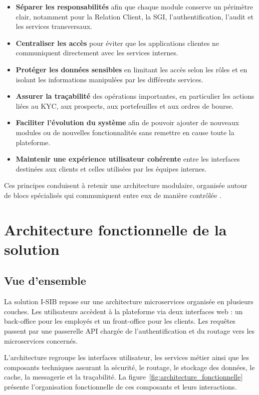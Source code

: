 \documentclass[a4paper,12pt]{report}
\begin{document}
\begin{itemize}
    \item \textbf{Séparer les responsabilités} afin que chaque module conserve un périmètre
          clair, notamment pour la Relation Client, la SGI, l'authentification, l'audit et
          les services transversaux.
    \item \textbf{Centraliser les accès} pour éviter que les applications clientes ne
          communiquent directement avec les services internes.
    \item \textbf{Protéger les données sensibles} en limitant les accès selon les rôles et
          en isolant les informations manipulées par les différents services.
    \item \textbf{Assurer la traçabilité} des opérations importantes, en particulier les
          actions liées au KYC, aux prospects, aux portefeuilles et aux ordres de bourse.
    \item \textbf{Faciliter l'évolution du système} afin de pouvoir ajouter de nouveaux
          modules ou de nouvelles fonctionnalités sans remettre en cause toute la
          plateforme.
    \item \textbf{Maintenir une expérience utilisateur cohérente} entre les interfaces
          destinées aux clients et celles utilisées par les équipes internes.
\end{itemize}

Ces principes conduisent à retenir une architecture modulaire, organisée autour de blocs
spécialisés qui communiquent entre eux de manière contrôlée \cite{fowler_microservices}.
\newpage{}
\section{Architecture fonctionnelle de la solution}

\subsection{Vue d'ensemble}

La solution I-SIB repose sur une architecture microservices organisée en plusieurs couches. Les utilisateurs accèdent à la plateforme via deux interfaces web : un back-office pour les employés et un front-office pour les clients. Les requêtes passent par une passerelle API chargée de l’authentification et du routage vers les microservices concernés.

L’architecture regroupe les interfaces utilisateur, les services métier ainsi que les composants techniques assurant la sécurité, le routage, le stockage des données, le cache, la messagerie et la traçabilité. La figure~\ref{fig:architecture_fonctionnelle} présente l’organisation fonctionnelle de ces composants et leurs interactions.
\end{document}
